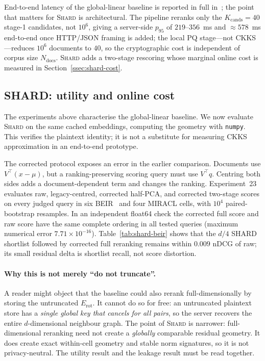 End-to-end latency of the global-linear baseline is reported in full
in~\cite{ref_alpha}; the point that matters for \textsc{Shard} is
architectural. The pipeline reranks only the $K_{\mathrm{cands}}{=}40$
stage-1 candidates, not $10^6$, giving a server-side $p_{95}$ of
$219$--$356$~ms and $\approx578$~ms end-to-end once HTTP/JSON framing is
added; the local PQ stage---not CKKS---reduces $10^6$ documents to $40$, so
the cryptographic cost is independent of corpus size $N_{\mathrm{docs}}$.
\textsc{Shard} adds a two-stage rescoring whose marginal online cost is
measured in Section~\ref{ssec:shard-cost}.

\subsection{SHARD: utility and online cost}\label{ssec:shard-utility}

The experiments above characterise the global-linear baseline. We now
evaluate \textsc{Shard} on the same cached embeddings, computing the
geometry with \texttt{numpy}. This verifies the plaintext identity; it is not
a substitute for measuring CKKS approximation in an end-to-end prototype.

The corrected protocol exposes an error in the earlier comparison. Documents
use $V^\top(x-\mu)$, but a ranking-preserving scoring query must use
$V^\top q$. Centring both sides adds a document-dependent term and changes
the ranking. Experiment~23 evaluates raw, legacy-centred, corrected
half-PCA, and corrected two-stage scores on every judged query in six
BEIR~\cite{ref_beir}
and four MIRACL cells, with $10^4$ paired-bootstrap resamples. In an
independent float64 check the corrected full score and raw score have the
same complete ordering in all tested queries (maximum numerical error
$7.71\times10^{-16}$). Table~\ref{tab:shard-beir} shows that the $d/4$ SHARD
shortlist followed by corrected full reranking remains within $0.009$ nDCG
of raw; its small residual delta is shortlist recall, not score distortion.

\paragraph{Why this is not merely ``do not truncate''.} A reader might
object that the baseline could also rerank full-dimensionally by storing
the untruncated $E_{\mathrm{rot}}$. It cannot do so for free: an untruncated
plaintext store has a \emph{single global key that cancels for all pairs},
so the server recovers the entire $d$-dimensional neighbour graph. The
point of \textsc{Shard} is narrower: full-dimensional reranking need not
create a \emph{globally} comparable residual geometry. It does create exact
within-cell geometry and stable norm signatures, so it is not privacy-neutral.
The utility result and the leakage result must be read together.

